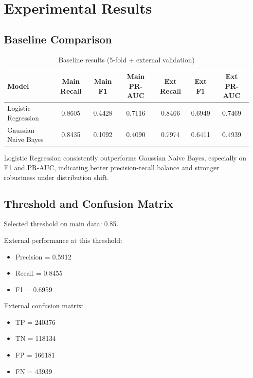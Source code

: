 \documentclass[12pt,a4paper]{article}
\begin{document}
\section{Experimental Results}
\subsection{Baseline Comparison}
\begin{table}[H]
\centering
\caption{Baseline results (5-fold + external validation)}
\begin{tabular}{lcccccc}
\toprule
Model & Main Recall & Main F1 & Main PR-AUC & Ext Recall & Ext F1 & Ext PR-AUC \\
\midrule
Logistic Regression & 0.8605 & 0.4428 & 0.7116 & 0.8466 & 0.6949 & 0.7469 \\
Gaussian Naive Bayes & 0.8435 & 0.1092 & 0.4090 & 0.7974 & 0.6411 & 0.4939 \\
\bottomrule
\end{tabular}
\end{table}

Logistic Regression consistently outperforms Gaussian Naive Bayes, especially on F1 and PR-AUC, indicating better precision-recall balance and stronger robustness under distribution shift.

\subsection{Threshold and Confusion Matrix}
Selected threshold on main data: 0.85.

External performance at this threshold:
\begin{itemize}
  \item Precision = 0.5912
  \item Recall = 0.8455
  \item F1 = 0.6959
\end{itemize}

External confusion matrix:
\begin{itemize}
  \item TP = 240376
  \item TN = 118134
  \item FP = 166181
  \item FN = 43939
\end{itemize}
\end{document}
